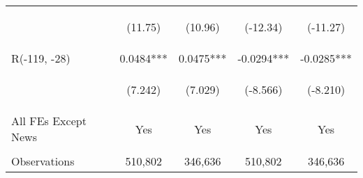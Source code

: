 \documentclass[border=0.2cm]{standalone}
\begin{document}
\begin{tabular}{lcccc}
    \vspace{4pt}        & \begin{footnotesize}(11.75)\end{footnotesize}  & \begin{footnotesize}(10.96)\end{footnotesize}  & \begin{footnotesize}(-12.34)\end{footnotesize} & \begin{footnotesize}(-11.27)\end{footnotesize} \\
    R(-119, -28)        & 0.0484***                                      & 0.0475***                                      & -0.0294***                                     & -0.0285***                                     \\
    \vspace{4pt}        & \begin{footnotesize}(7.242)\end{footnotesize}  & \begin{footnotesize}(7.029)\end{footnotesize}  & \begin{footnotesize}(-8.566)\end{footnotesize} & \begin{footnotesize}(-8.210)\end{footnotesize} \\
    All FEs Except News & Yes                                            & Yes                                            & Yes                                            & Yes                                            \\
    \vspace{4pt}        & \begin{footnotesize}\end{footnotesize}         & \begin{footnotesize}\end{footnotesize}         & \begin{footnotesize}\end{footnotesize}         & \begin{footnotesize}\end{footnotesize}         \\
    Observations        & 510,802                                        & 346,636                                        & 510,802                                        & 346,636                                        \\

\end{tabular}
\end{document}
